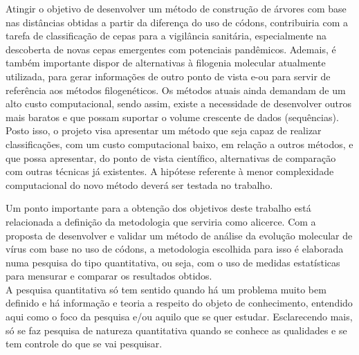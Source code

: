 Atingir o objetivo de desenvolver um método de construção de árvores com base nas distâncias obtidas a partir da diferença do uso de códons, contribuiria com a tarefa de classificação de cepas para a vigilância sanitária, especialmente na descoberta de novas cepas emergentes com potenciais pandêmicos. Ademais, é também importante dispor de alternativas à filogenia molecular atualmente utilizada, para gerar informações de outro ponto de vista e-ou para servir de referência aos métodos filogenéticos.
Os métodos atuais ainda demandam de um alto custo computacional, sendo assim, existe a necessidade de desenvolver outros mais baratos e que possam suportar o volume crescente de dados (sequências).
Posto isso, o projeto visa apresentar um método que seja capaz de realizar classificações, com um custo computacional baixo, em relação a outros métodos, e que possa apresentar, do ponto de vista científico, alternativas de comparação com outras técnicas já existentes. A hipótese referente à menor complexidade computacional do novo método deverá ser testada no trabalho.

Um ponto importante para a obtenção dos objetivos deste trabalho está relacionada a definição da metodologia que serviria como alicerce. Com a proposta de desenvolver e validar um método de análise da evolução molecular de vírus com base no uso de códons, a metodologia escolhida para isso é elaborada numa pesquisa do tipo quantitativa, ou seja, com o uso de medidas estatísticas para mensurar e comparar os resultados obtidos.\\
A pesquisa quantitativa só tem sentido quando há um problema muito bem definido e há informação e teoria a respeito do objeto de conhecimento, entendido aqui como o foco da pesquisa e/ou aquilo que se quer estudar. Esclarecendo mais, só se faz pesquisa de natureza quantitativa quando se conhece as qualidades e se tem controle do que se vai pesquisar.\cite{da_silva_pesquisa_2014}


